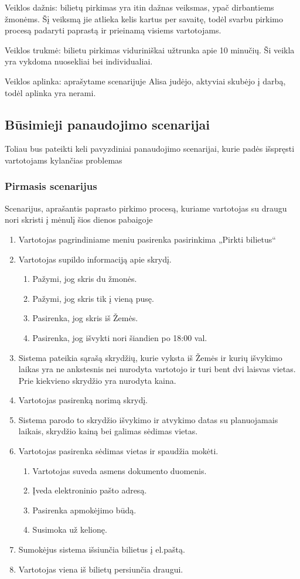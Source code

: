 \documentclass{VUMIFPSkursinis}
\begin{document}
Veiklos dažnis: bilietų pirkimas yra itin dažnas veiksmas, ypač dirbantiems žmonėms. Šį veiksmą jie atlieka kelis kartus per savaitę, todėl svarbu pirkimo procesą padaryti paprastą ir prieinamą visiems vartotojams.

Veiklos trukmė: bilietu pirkimas viduriniškai užtrunka apie 10 minučių. Ši veikla yra vykdoma nuosekliai bei individualiai.

Veiklos aplinka: aprašytame scenarijuje Alisa judėjo, aktyviai skubėjo į darbą, todėl aplinka yra nerami.

\subsection{Būsimieji panaudojimo scenarijai}
Toliau bus pateikti keli pavyzdiniai panaudojimo scenarijai, kurie padės išspręsti vartotojams kylančias problemas

\subsubsection{Pirmasis scenarijus}
Scenarijus, aprašantis paprasto pirkimo procesą, kuriame vartotojas su draugu nori skristi į mėnulį šios dienos pabaigoje

\begin{enumerate}
\item Vartotojas pagrindiniame meniu pasirenka pasirinkima „Pirkti bilietus“
\item Vartotojas supildo informaciją apie skrydį.
\begin{enumerate}[label*=\arabic*.]
\item Pažymi, jog skris du žmonės.
\item Pažymi, jog skris tik į vieną pusę.
\item Pasirenka, jog skris iš Žemės.
\item Pasirenka, jog išvykti nori šiandien po 18:00 val.
\end{enumerate}
\item  Sistema pateikia sąrašą skrydžių, kurie vyksta iš Žemės ir kurių išvykimo laikas yra ne ankstesnis nei nurodyta vartotojo ir turi bent dvi laisvas vietas. Prie kiekvieno skrydžio yra nurodyta kaina.
\item Vartotojas pasirenką norimą skrydį.
\item Sistema parodo to skrydžio išvykimo ir atvykimo datas su planuojamais laikais, skrydžio kainą bei galimas sėdimas vietas.
\item Vartotojas pasirenka sėdimas vietas ir spaudžia mokėti.
\begin{enumerate}[label*=\arabic*.]
\item Vartotojas suveda asmens dokumento duomenis.
\item Įveda elektroninio pašto adresą.
\item Pasirenka apmokėjimo būdą.
\item Susimoka už kelionę.
\end{enumerate}
\item Sumokėjus sistema išsiunčia bilietus į el.paštą.
\item Vartotojas viena iš bilietų persiunčia draugui.
\end{enumerate}
\end{document}
